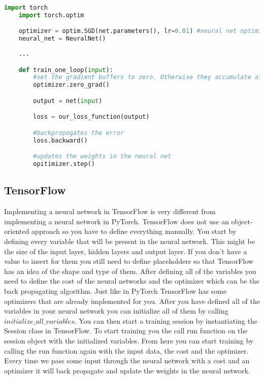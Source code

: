 \begin{lstlisting}[language=Python]
	import torch
	import torch.optim

	optimizer = optim.SGD(net.parameters(), lr=0.01) #neural net optimizer using SGD update rules
	neural_net = NeuralNet()
	
	...

	def train_one_loop(input):
		#set the gradient buffers to zero. Otherwise they accumulate after every loop
		optimizer.zero_grad() 

		output = net(input)

		loss = our_loss_function(output)

		#backpropogates the error
		loss.backward() 

		#updates the weights in the neural net
		opitimizer.step() 

\end{lstlisting}

\subsection{TensorFlow}
Implementing a neural network in TensorFlow is very different from implementing a neural network in PyTorch.
TensorFlow does not use an object-oriented approach so you have to define everything manually.
You start by defining every variable that will be present in the neural network.
This might be the size of the input layer, hidden layers and output layer.
If you don't have a value to insert for them you still need to define placeholders so that TensorFlow has an idea of the shape and type of them.
After defining all of the variables you need to define the cost of the neural networks and the optimizer which can be the back propagating algorithm.
Just like in PyTorch TensorFlow has some optimizers that are already implemented for you. 
After you have defined all of the variables in your neural network you can initialize all of them by calling \textit{$initialize\_all\_variables$}.
You can then start a training session by instantiating the Session class in TensorFlow.
To start training you the call run function on the session object with the initialized variables.
From here you can start training by calling the run function again with the input data, the cost and the optimizer.
Every time we pass some input through the neural network with a cost and an optimizer it will back propagate and update the weights in the neural network.

